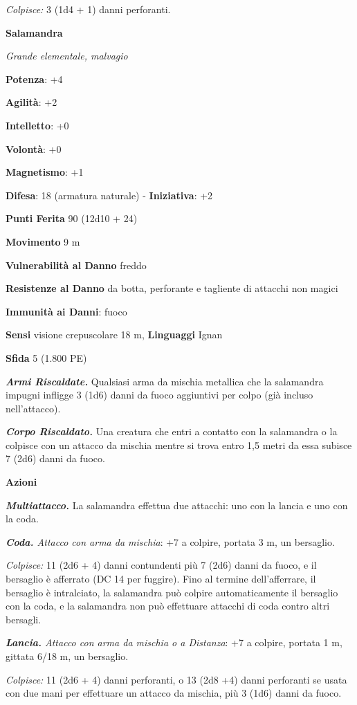\begin{multicols}{2}
\emph{Colpisce:} 3 (1d4 + 1) danni perforanti.

\textbf{Salamandra}

\emph{Grande elementale, malvagio}

\textbf{Potenza}: +4

\textbf{Agilità}: +2

\textbf{Intelletto}: +0

\textbf{Volontà}: +0

\textbf{Magnetismo}: +1

\textbf{Difesa}: 18 (armatura naturale) - \textbf{Iniziativa}: +2

\textbf{Punti Ferita} 90 (12d10 + 24)

\textbf{Movimento} 9 m

\textbf{Vulnerabilità al Danno} freddo

\textbf{Resistenze al Danno} da botta, perforante e tagliente di
attacchi non magici

\textbf{Immunità ai Danni}: fuoco

\textbf{Sensi} visione crepuscolare 18 m, 
\textbf{Linguaggi} Ignan

\textbf{Sfida} 5 (1.800 PE)\smallskip

\emph{\textbf{Armi Riscaldate.}} Qualsiasi arma da mischia metallica che
la salamandra impugni infligge 3 (1d6) danni da fuoco aggiuntivi per
colpo (già incluso nell'attacco).

\emph{\textbf{Corpo Riscaldato.}} Una creatura che entri a contatto con
la salamandra o la colpisce con un attacco da mischia mentre si trova
entro 1,5 metri da essa subisce 7 (2d6) danni da fuoco.

\smallskip\textbf{Azioni}

\emph{\textbf{Multiattacco.}} La salamandra effettua due attacchi: uno
con la lancia e uno con la coda.

\emph{\textbf{Coda.} Attacco con arma da mischia}: +7 a colpire, portata
3 m, un bersaglio.

\emph{Colpisce:} 11 (2d6 + 4) danni contundenti più 7 (2d6) danni da
fuoco, e il bersaglio è afferrato (DC 14 per fuggire). Fino al termine
dell'afferrare, il bersaglio è intralciato, la salamandra può colpire
automaticamente il bersaglio con la coda, e la salamandra non può
effettuare attacchi di coda contro altri bersagli.

\emph{\textbf{Lancia.} Attacco con arma da mischia o a Distanza}: +7 a
colpire, portata 1 m, gittata 6/18 m, un bersaglio.

\emph{Colpisce:} 11 (2d6 + 4) danni perforanti, o 13 (2d8 +4) danni
perforanti se usata con due mani per effettuare un attacco da mischia,
più 3 (1d6) danni da fuoco.




\end{multicols}
